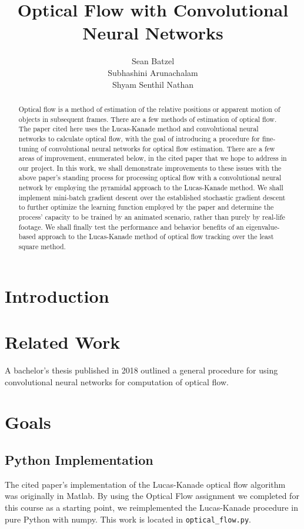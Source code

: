 \documentclass[]{article}
\title{Optical Flow with Convolutional Neural Networks}
\author{Sean Batzel\\Subhashini Arunachalam\\Shyam Senthil Nathan}
\begin{document}
\maketitle
\nocite{*}

\pagebreak
\begin{abstract}
    Optical flow is a method of estimation of the relative positions or apparent motion of objects in subsequent frames.
    There are a few methods of estimation of optical flow.
    The paper cited here uses the Lucas-Kanade method and convolutional neural networks to calculate optical flow, with the goal of introducing a procedure for fine-tuning of convolutional neural networks for optical flow estimation.
    There are a few areas of improvement, enumerated below, in the cited paper that we hope to address in our project.
    In this work, we shall demonstrate improvements to these issues with the above paper’s standing process for processing optical flow with a convolutional neural network by employing the pyramidal approach to the Lucas-Kanade method.
    We shall implement mini-batch gradient descent over the established stochastic gradient descent to further optimize the learning function employed by the paper and determine the process’ capacity to be trained by an animated scenario, rather than purely by real-life footage.
    We shall finally test the performance and behavior benefits of an eigenvalue-based approach to the Lucas-Kanade method of optical flow tracking over the least square method.
\end{abstract}

\section{Introduction}\label{sec:introduction}

\section{Related Work}\label{sec:related-work}
A bachelor's thesis published in 2018 outlined a general procedure for using convolutional neural networks for computation of optical flow.\cite{flett}

\section{Goals}\label{sec:goals}
\subsection{Python Implementation}\label{subsec:python-implementation}
The cited paper's implementation of the Lucas-Kanade optical flow algorithm was originally in Matlab.
By using the Optical Flow assignment we completed for this course as a starting point, we reimplemented the Lucas-Kanade procedure in pure Python with numpy.
This work is located in \verb|optical_flow.py|.
\end{document}
